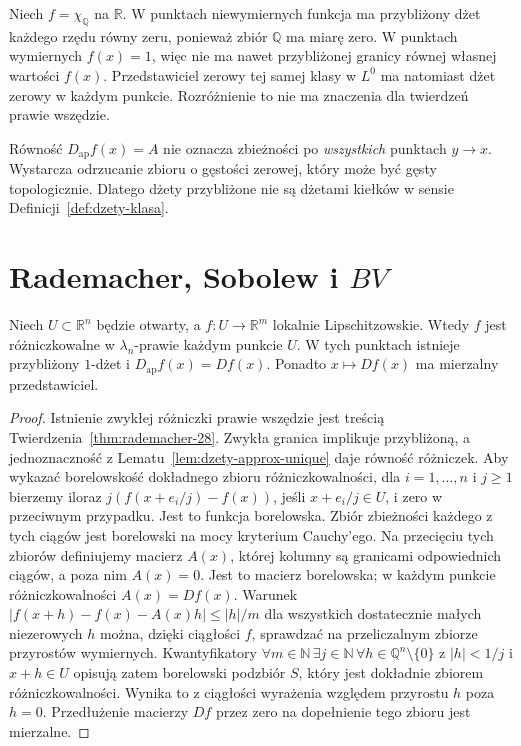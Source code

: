 \begin{przyklad}
Niech $f=\chi_{\mathbb Q}$ na $\mathbb R$. W punktach
niewymiernych funkcja ma przybliżony dżet każdego rzędu
równy zeru, ponieważ zbiór $\mathbb Q$ ma miarę zero.
W punktach wymiernych $f(x)=1$, więc nie ma nawet
przybliżonej granicy równej własnej wartości $f(x)$.
Przedstawiciel zerowy tej samej klasy w $L^0$ ma natomiast
dżet zerowy w każdym punkcie. Rozróżnienie to nie ma
znaczenia dla twierdzeń prawie wszędzie.
\end{przyklad}

\begin{uwaga}
Równość $D_{\mathrm{ap}}f(x)=A$ nie oznacza
zbieżności po \emph{wszystkich} punktach $y\to x$.
Wystarcza odrzucanie zbioru o gęstości zerowej,
który może być gęsty topologicznie. Dlatego dżety
przybliżone nie są dżetami kiełków w sensie
Definicji~\ref{def:dzety-klasa}.
\end{uwaga}

\section{Rademacher, Sobolew i \texorpdfstring{$BV$}{BV}}
\begin{twierdzenie}
\label{thm:dzety-rademacher}
Niech $U\subset\mathbb R^n$ będzie otwarty, a
$f:U\to\mathbb R^m$ lokalnie Lipschitzowskie.
Wtedy $f$ jest różniczkowalne w $\lambda_n$-prawie każdym
punkcie $U$. W tych punktach istnieje przybliżony
$1$-dżet i $D_{\mathrm{ap}}f(x)=Df(x)$.
Ponadto $x\mapsto Df(x)$ ma mierzalny przedstawiciel.
\end{twierdzenie}
\begin{proof}
Istnienie zwykłej różniczki prawie wszędzie jest treścią
Twierdzenia~\ref{thm:rademacher-28}. Zwykła granica
implikuje przybliżoną, a jednoznaczność z
Lematu~\ref{lem:dzety-approx-unique} daje równość różniczek.
Aby wykazać borelowskość dokładnego zbioru
różniczkowalności, dla $i=1,\ldots,n$ i $j\ge1$
bierzemy iloraz $j(f(x+e_i/j)-f(x))$, jeśli
$x+e_i/j\in U$, i zero w przeciwnym przypadku.
Jest to funkcja borelowska. Zbiór zbieżności
każdego z tych ciągów jest borelowski na mocy
kryterium Cauchy'ego. Na przecięciu tych zbiorów
definiujemy macierz $A(x)$, której kolumny są
granicami odpowiednich ciągów, a poza nim
$A(x)=0$. Jest to macierz borelowska; w każdym
punkcie różniczkowalności $A(x)=Df(x)$.
Warunek
$|f(x+h)-f(x)-A(x)h|\le |h|/m$
dla wszystkich dostatecznie małych niezerowych $h$
można, dzięki ciągłości $f$, sprawdzać na przeliczalnym
zbiorze przyrostów wymiernych. Kwantyfikatory
$\forall m\in\mathbb N\,\exists j\in\mathbb N\,
\forall h\in\mathbb Q^n\setminus\{0\}$ z $|h|<1/j$
i $x+h\in U$ opisują zatem borelowski podzbiór $S$,
który jest dokładnie zbiorem różniczkowalności.
Wynika to z ciągłości wyrażenia względem przyrostu $h$
poza $h=0$. Przedłużenie macierzy
$Df$ przez zero na dopełnienie tego zbioru jest mierzalne.
\end{proof}

